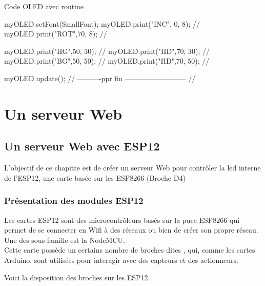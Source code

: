 \begin{Cpp}{Code OLED avec routine}
{    myOLED.setFont(SmallFont);
    myOLED.print("INC", 0, 8);   // 
    myOLED.print("ROT",70, 8);   //  

    myOLED.print("HG",50, 30);    // 
    myOLED.print("HD",70, 30);    // 
    myOLED.print("BG",50, 50);    // 
    myOLED.print("HD",70, 50);    // 

    myOLED.update();
  // ----------ppr fin --------------------------
  //

}
\end{Cpp}\part{Un serveur Web}
\chapter{Un serveur Web avec ESP12}

L'objectif de ce chapitre est de créer un serveur Web pour contrôler la led interne de l'ESP12, une carte basée sur les ESP8266 
(Broche D4)




\section{Présentation des modules ESP12}


Les cartes ESP12 sont des microcontrôleurs basés sur la puce ESP8266 
qui permet de se connecter en Wifi à des réseaux ou bien de créer son propre réseau.
Une des sous-famille est la NodeMCU.\\

Cette carte possède un certains nombre de broches dites , qui, comme les cartes Arduino, 
sont utilisées pour interagir avec des capteurs et des actionneurs.

Voici la disposition des broches sur les ESP12.



